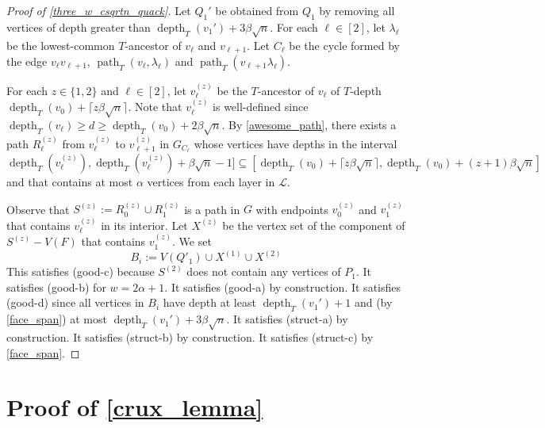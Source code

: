 \documentclass{patmorin}
\DeclareMathOperator{\depth}{depth}
\DeclareMathOperator{\pth}{path}
\begin{document}
\begin{proof}[Proof of \cref{three_w_csqrtn_quack}]


  Let $Q_1'$ be obtained from $Q_1$ by removing all vertices of depth greater than $\depth_T(v_1')+3\beta\sqrt{n}$.
  For each $\ell\in[2]$, let $\lambda_\ell$ be the lowest-common $T$-ancestor of $v_\ell$ and $v_{\ell+1}$.
  Let $C_\ell$ be the cycle formed by the edge $v_\ell v_{\ell+1}$,  $\pth_T(v_\ell,\lambda_\ell)$ and $\pth_T(v_{\ell+1}\lambda_\ell)$.

  For each $z\in\{1,2\}$ and $\ell\in[2]$, let $v_\ell^{(z)}$ be the $T$-ancestor of $v_\ell$ of $T$-depth $\depth_T(v_0)+\lceil z\beta\sqrt{n}\rceil$.  Note that $v_\ell^{(z)}$ is well-defined since $\depth_T(v_\ell)\ge d \ge \depth_T(v_0)+2\beta\sqrt{n}$.
  By \cref{awesome_path}, there exists a path $R^{(z)}_\ell$ from $v^{(z)}_\ell$ to $v^{(z)}_{\ell+1}$ in  $G_{C_\ell}$ whose vertices have depths in the interval
   \begin{equation}
      \depth_T(v^{(z)}_\ell),\depth_T(v^{(z)}_\ell)+\beta\sqrt{n}-1]
      \subseteq[\depth_T(v_0)+\lceil z\beta\sqrt{n}\rceil,\depth_T(v_0)+ (z+1)\beta\sqrt{n}] \label{face_span}
   \end{equation}
   and that contains at most $\alpha$ vertices from each layer in $\mathcal{L}$.

  Observe that $S^{(z)} := R^{(z)}_{0}\cup R^{(z)}_{1}$ is a path in $G$ with endpoints $v^{(z)}_{0}$ and $v^{(z)}_{1}$ that contains $v^{(z)}_\ell$ in its interior.  Let $X^{(z)}$ be the vertex set of the component of $S^{(z)}-V(F)$ that contains $v^{(z)}_1$.
  We set
  \[
     B_i := V(Q'_1)\cup X^{(1)} \cup X^{(2)}
  \]
  This satisfies (good-c) because $S^{(2)}$ does not contain any vertices of $P_1$. It satisfies (good-b) for $w=2\alpha+1$. It satisfies (good-a) by construction. It satisfies (good-d) since all vertices in $B_i$ have depth at least $\depth_T(v_1')+1$ and (by \cref{face_span}) at most $\depth_T(v_1')+3\beta\sqrt{n}$.   It satisfies (struct-a) by construction.  It satisfies (struct-b) by construction.  It satisfies (struct-c) by \cref{face_span}.
\end{proof}



\section{Proof of \cref{crux_lemma}}
\label{crux_section}




\end{document}

